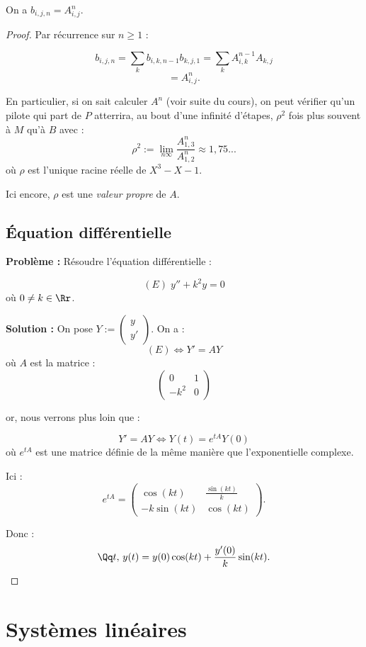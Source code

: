 \documentclass[class=report,crop=false]{standalone}
\begin{document}
On a $b_{i,j,n} = A^n_{i,j}$. \begin{proof}
Par récurrence sur $n \ge 1$ :

\[b_{i,j,n}= \sum_k b_{i,k,n-1}b_{k,j,1} = \sum_k A^{n-1}_{i,k}A_{k,j}\]
\[ = A^n_{i,j} .\]

En particulier, si on sait calculer $A^n$ (voir suite du cours), on peut vérifier qu'un pilote qui part de  $P$ atterrira, au bout d'une infinité d'étapes, $\rho^2$ fois plus souvent à $M$ qu'à $B$ avec :
\[\rho^2:=\lim_{n \infty}\frac{A^n_{1,3}}{A^n_{1,2}} \approx 1,75...\]\label{exdupilote}
où $\rho$ est l'unique racine réelle de $X^3-X-1$.

Ici encore, $\rho$ est une {\it valeur propre} de $A$.

\subsection{Équation différentielle} 

{\bf Problème : } Résoudre l'équation différentielle :

\[(E)\; y''+k^2y=0 \]
où $0\neq k \in \Rr$.

{\bf Solution :} On pose $Y:=\left( \begin{array}{c}
y\\
y'
\end{array}\right)$. On a :
\[(E) \iff Y'=AY\]
où $A$ est la matrice :
\[\left(\begin{array}{cc}
0 &1\\
-k^2 & 0
\end{array}\right)\]

or, nous verrons plus loin que :

\[Y' = AY \iff Y(t) = e^{tA}Y(0)\]
où $e^{tA}$ est une matrice définie de la même manière que l'exponentielle complexe. 

Ici :
\[e^{tA} = \left(\begin{array}{cc}
\cos (kt) & \frac{\sin (kt)}{k}\\
-k\sin (kt) & \cos (kt)
\end{array}\right) .\]

Donc : \[\Qq t,\, y(t) = y(0)\cos(kt) +\frac{y'(0)}{k}\sin (kt) .\]

\end{proof} 

\section{Systèmes linéaires}
\end{document}
